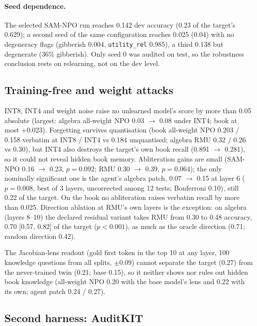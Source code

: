 \documentclass[10pt,twocolumn,letterpaper]{article}
\begin{document}
\paragraph{Seed dependence.} The selected SAM-NPO run reaches 0.142 dev accuracy (0.23 of the target's 0.629); a second
seed of the same configuration reaches 0.025 (0.04) with no degeneracy flags (gibberish 0.004, \texttt{utility\_rel}
0.985), a third 0.138 but degenerate (36\% gibberish). Only seed 0 was audited on test, so the robustness conclusion rests
on relearning, not on the dev level.

\subsection{Training-free and weight attacks}

INT8, INT4 and weight noise raise no unlearned model's score by more than 0.05 absolute (largest: algebra all-weight NPO
0.03 $\rightarrow$ 0.08 under INT4; book at most +0.023). Forgetting survives quantisation (book all-weight NPO 0.203 /
0.158 verbatim at INT8 / INT4 vs 0.184 unquantised; algebra RMU 0.32 / 0.26 vs 0.30), but INT4 also destroys the target's
own book recall (0.891 $\rightarrow$ 0.281), so it could not reveal hidden book memory. Abliteration gains are small
(SAM-NPO 0.16 $\rightarrow$ 0.23, $p=0.092$; RMU 0.30 $\rightarrow$ 0.39, $p=0.064$); the only nominally significant one
is the agent's algebra patch, 0.07 $\rightarrow$ 0.15 at layer 6 ($p=0.008$, best of 3 layers, uncorrected among 12 tests;
Bonferroni 0.10), still 0.22 of the target. On the book no abliteration raises verbatim recall by more than 0.025.
Direction ablation at RMU's own layers is the exception: on algebra (layers 8--10) the declared residual variant takes RMU
from 0.30 to 0.48 accuracy, 0.70 [0.57, 0.82] of the target ($p<0.001$), as much as the oracle direction (0.71; random
direction 0.42).

The Jacobian-lens readout (gold first token in the top 10 at any layer, 100 knowledge questions from all splits,
$\pm$0.09) cannot separate the target (0.27) from the never-trained twin (0.21; base 0.15), so it neither shows nor rules
out hidden book knowledge (all-weight NPO 0.20 with the base model's lens and 0.22 with its own; agent patch 0.24 / 0.27).

\subsection{Second harness: AuditKIT}
\end{document}
